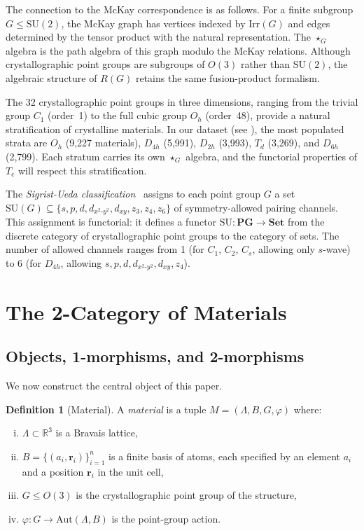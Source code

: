 \documentclass[12pt,a4paper]{article}
\theoremstyle{plain}
\theoremstyle{definition}
\newtheorem{definition}[theorem]{Definition}
\theoremstyle{remark}
\newcommand{\Tc}{T_{\mathrm{c}}}
\newcommand{\starG}{\star_G}
\begin{document}
The connection to the McKay correspondence is as follows.  For a finite
subgroup $G \leq \mathrm{SU}(2)$, the McKay graph has vertices indexed by
$\mathrm{Irr}(G)$ and edges determined by the tensor product with the
natural representation.  The $\starG$ algebra is the path algebra of this
graph modulo the McKay relations.  Although crystallographic point groups
are subgroups of $O(3)$ rather than $\mathrm{SU}(2)$, the algebraic
structure of $R(G)$ retains the same fusion-product formalism.

The 32 crystallographic point groups in three dimensions, ranging from the
trivial group $C_1$ (order~1) to the full cubic group $O_h$ (order~48),
provide a natural stratification of crystalline materials.  In our dataset
(see ), the most populated strata are $O_h$ (9{,}227
materials), $D_{4h}$ (5{,}991), $D_{2h}$ (3{,}993), $T_d$ (3{,}269), and
$D_{6h}$ (2{,}799).  Each stratum carries its own $\starG$ algebra, and the
functorial properties of $\Tc$ will respect this stratification.

The \emph{Sigrist-Ueda classification}~\cite{placeholder_BCS} assigns to
each point group $G$ a set $\mathrm{SU}(G) \subseteq
\{s, p, d, d_{x^2\text{-}y^2}, d_{xy}, z_3, z_4, z_6\}$ of symmetry-allowed
pairing channels.  This assignment is functorial: it defines a functor
$\mathrm{SU} \colon \mathbf{PG} \to \mathbf{Set}$ from the discrete category
of crystallographic point groups to the category of sets.  The number of
allowed channels ranges from 1 (for $C_1$, $C_2$, $C_s$, allowing only
$s$-wave) to 6 (for $D_{4h}$, allowing $s, p, d, d_{x^2\text{-}y^2},
d_{xy}, z_4$).


\section{The 2-Category of Materials}\label{sec:2cat-mat}

\subsection{Objects, 1-morphisms, and 2-morphisms}

We now construct the central object of this paper.

\begin{definition}[Material]\label{def:material}
A \emph{material} is a tuple $M = (\Lambda, B, G, \varphi)$ where:
\begin{enumerate}[(i)]
  \item $\Lambda \subset \mathbb{R}^3$ is a Bravais lattice,
  \item $B = \{(a_i, \mathbf{r}_i)\}_{i=1}^{n}$ is a finite basis of atoms,
    each specified by an element $a_i$ and a position $\mathbf{r}_i$ in the
    unit cell,
  \item $G \leq O(3)$ is the crystallographic point group of the structure,
  \item $\varphi \colon G \to \mathrm{Aut}(\Lambda, B)$ is the point-group
    action.
\end{enumerate}
\end{definition}
\end{document}
